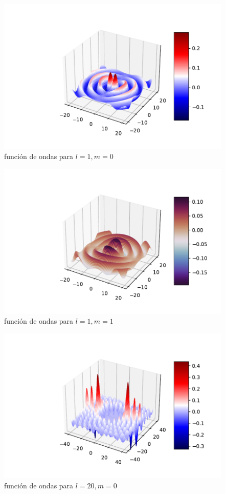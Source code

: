 \documentclass[12pt,a4paper]{article}
\numberwithin{equation}{section}
\numberwithin{figure}{section}
\begin{document}
\begin{figure}[h!] \centering
\includegraphics[scale=1]{funcionesbessel1.pdf}
\caption{función de ondas para $l=1,m=0$}
\label{Fig:funcionesbessel1}
\end{figure}

\begin{figure}[h!] \centering
\includegraphics[scale=1]{funcionesbessel1-1.pdf}
\caption{función de ondas para $l=1,m=1$}
\label{Fig:funcionesbessel1-1}
\end{figure}

\begin{figure}[h!] \centering
\includegraphics[scale=1]{funcionesbessel20.pdf}
\caption{función de ondas para $l=20,m=0$}
\label{Fig:funcionesbessel20}
\end{figure}
\end{document}

